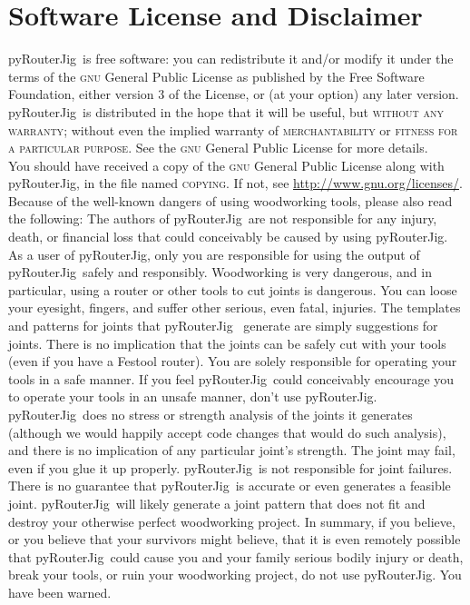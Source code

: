 \documentclass[12pt,final]{article}
\newcommand{\codename}[0]{pyRouterJig}
\begin{document}
\section{Software License and Disclaimer}
\label{sec:license}

\codename~is free software: you can redistribute it and/or modify it under
the terms of the \textsc{gnu} General Public License as published by the Free Software
Foundation, either version 3 of the License, or (at your option) any later
version.\\

\codename~is distributed in the hope that it will be useful, but
\textsc{without any warranty}; without even the implied warranty of
\textsc{merchantability} or \textsc{fitness for a particular
  purpose}.  See the \textsc{gnu} General Public License for more details.\\

You should have received a copy of the \textsc{gnu} General Public License along with
\codename, in the file named \textsc{copying}.  If not, see
\url{http://www.gnu.org/licenses/}.\\

Because of the well-known dangers of using woodworking tools, please also read
the following: The authors of \codename~are not responsible for any injury,
death, or financial loss that could conceivably be caused by using \codename.  As a user
of \codename, only you are responsible for using the output of
\codename~safely and responsibly.  Woodworking is very dangerous, and in
particular, using a router or other tools to cut joints is dangerous.  You can
loose your eyesight, fingers, and suffer other serious, even fatal,
injuries. The templates and patterns for joints that \codename~ generate are
simply suggestions for joints.  There is no implication that the joints can be
safely cut with your tools (even if you have a Festool router).  You are
solely responsible for operating your tools in a safe manner.  If you feel
\codename~could conceivably encourage you to operate your tools in an unsafe
manner, don't use \codename.  \codename~does no stress or strength analysis of
the joints it generates (although we would happily accept code changes that
would do such analysis), and there is no implication of any particular joint's
strength.  The joint may fail, even if you glue it up properly. \codename~is
not responsible for joint failures.  There is no guarantee that \codename~is
accurate or even generates a feasible joint.  \codename~will likely generate a
joint pattern that does not fit and destroy your otherwise perfect woodworking
project.  In summary, if you believe, or you believe that your survivors might
believe, that it is even remotely possible that \codename~could cause you and
your family serious bodily injury or death, break your tools, or ruin your
woodworking project, do not use \codename.  You have been warned.
\end{document}
